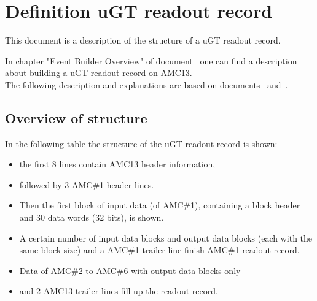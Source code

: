 
% 

\section{Definition uGT readout record}

This document is a description of the structure of a uGT readout record.

In chapter "Event Builder Overview" of document~\cite{AMC13} one can find a description about building a uGT readout record on AMC13.\\
The following description and explanations are based on documents~\cite{AMC13} and~\cite{MP7}.

\subsection{Overview of structure}
In the following table the structure of the uGT readout record is shown:
\begin{itemize}
\item the first 8 lines contain AMC13 header information, 
\item followed by 3 AMC\#1 header lines.
\item Then the first block of input data (of AMC\#1), containing a block header and 30 data words (32 bits), is shown.
\item A certain number of input data blocks and output data blocks (each with the same block size) and a AMC\#1 trailer line finish AMC\#1 readout record.
\item Data of AMC\#2 to AMC\#6 with output data blocks only
\item and 2 AMC13 trailer lines fill up the readout record.
\end{itemize}

